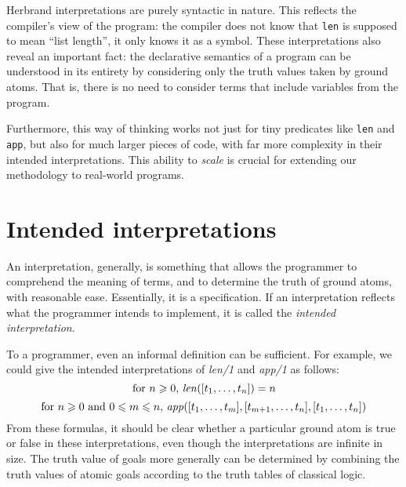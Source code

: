 Herbrand interpretations are purely syntactic in nature.
This reflects the compiler's view of the program:
the compiler does not know that \texttt{len}
is supposed to mean ``list length'',
it only knows it as a symbol.
These interpretations also reveal an important fact:
the declarative semantics of a program
can be understood in its entirety
by considering only the truth values taken by ground atoms.
That is, there is no need to consider terms that include
variables from the program.

Furthermore,
this way of thinking works not just for tiny predicates
like \texttt{len} and \texttt{app},
but also for much larger pieces of code,
with far more complexity in their intended interpretations.
This ability to \emph{scale} is crucial for
extending our methodology to real-world programs.


\section{Intended interpretations}
\label{sec:intended-interp}

An interpretation\label{gi:interpretation}, generally,
is something that allows the programmer
to comprehend the meaning of terms,
and to determine the truth of ground atoms,
with reasonable ease.
Essentially, it is a specification.
If an interpretation reflects what the programmer intends to implement,
it is called the
\emph{intended interpretation\label{gi:intended-interpretation}}.

To a programmer, even an informal definition can be sufficient.
For example, we could give the intended interpretations
of \textit{len/1} and \textit{app/1} as follows:
\[
\text{for } n \geqslant 0, \,\text{\textit{len}}([t_1, \ldots, t_n]) = n
\]
\[
\text{for } n \geqslant 0 \text{ and } 0 \leqslant m \leqslant n,
\,\text{\textit{app}}([t_1, \ldots, t_m], [t_{m+1}, \ldots, t_n], [t_1, \ldots, t_n])
\]
From these formulas,
it should be clear whether a particular ground atom
is true or false in these interpretations,
even though the interpretations are infinite in size.
The truth value of goals more generally
can be determined by combining the truth values of atomic goals
according to the truth tables of classical logic.

